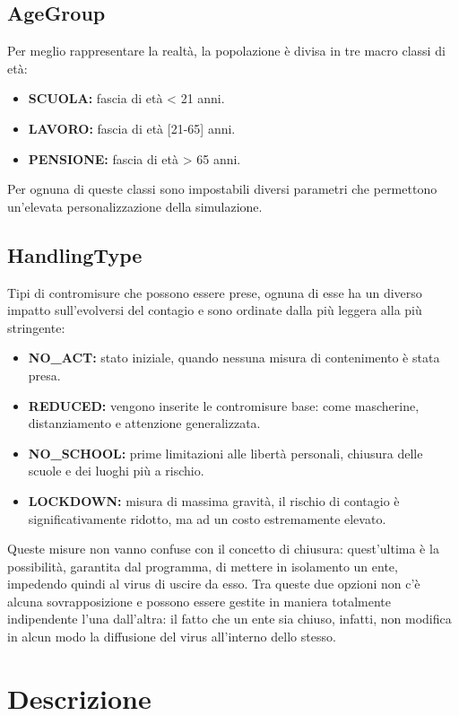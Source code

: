 \documentclass[a4paper, 12pt]{article}
\begin{document}
	\subsection{AgeGroup}
		Per meglio rappresentare la realtà, la popolazione è divisa in tre macro classi di età:

		\begin{itemize}
			\item \textbf{SCUOLA:} fascia di età < 21 anni.
			\item \textbf{LAVORO:} fascia di età [21-65] anni.
			\item \textbf{PENSIONE:} fascia di età > 65 anni.
		\end{itemize}
	Per ognuna di queste classi sono impostabili diversi parametri che permettono un'elevata personalizzazione della simulazione.
	
	\subsection{HandlingType}
	Tipi di contromisure che possono essere prese, ognuna di esse ha un diverso impatto sull'evolversi del contagio e sono ordinate dalla più leggera alla più stringente:
	
	\begin{itemize}
		\item \textbf{NO\_ACT:} stato iniziale, quando nessuna misura di contenimento è stata presa.
		\item \textbf{REDUCED:} vengono inserite le contromisure base: come mascherine, distanziamento e attenzione generalizzata.
		\item \textbf{NO\_SCHOOL:} prime limitazioni alle libertà personali, chiusura delle scuole e dei luoghi più a rischio.
		\item \textbf{LOCKDOWN:} misura di massima gravità, il rischio di contagio è significativamente ridotto, ma ad un costo estremamente elevato.
	\end{itemize}
	Queste misure non vanno confuse con il concetto di chiusura: quest'ultima è la possibilità, garantita dal programma, di mettere in isolamento un ente, impedendo quindi al virus di uscire da esso.
	Tra queste due opzioni non c'è alcuna sovrapposizione e possono essere gestite in maniera totalmente indipendente l'una dall'altra: il fatto che un ente sia chiuso, infatti, non modifica in alcun modo la diffusione del virus all'interno dello stesso.

\newpage

\section{Descrizione}
	
\end{document}
